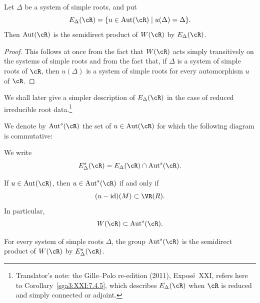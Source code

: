\begin{proposition}\label{sga3:XXI:6.7.2}
Let \(\Delta\) be a system of simple roots, and put
\[
 E_\Delta(\cR)=
 \{u\in\operatorname{Aut}(\cR)\mid u(\Delta)=\Delta\}.
\]
Then \(\operatorname{Aut}(\cR)\) is the semidirect product of
\(W(\cR)\) by \(E_\Delta(\cR)\).
\end{proposition}

\begin{proof}
This follows at once from the fact that \(W(\cR)\) acts simply
transitively on the systems of simple roots and from the fact that,
if \(\Delta\) is a system of simple roots of \(\cR\), then
\(u(\Delta)\) is a system of simple roots for every automorphism
\(u\) of \(\cR\).
\end{proof}

We shall later give a simpler description of \(E_\Delta(\cR)\) in
the case of reduced irreducible root data.\footnote{Translator's note: the Gille--Polo re-edition (2011), Exposé~XXI, refers here to
Corollary~\ref{sga3:XXI:7.4.5}, which describes \(E_\Delta(\cR)\) when \(\cR\) is reduced
and simply connected or adjoint.}

\begin{definition}\label{sga3:XXI:6.7.3}
We denote by \(\operatorname{Aut}^{s}(\cR)\)
the set of \(u\in\operatorname{Aut}(\cR)\) for which the following
diagram is commutative:
\begin{center}
\end{center}
We write
\[
 E_\Delta^{s}(\cR)
 =E_\Delta(\cR)\cap\operatorname{Aut}^{s}(\cR).
\]
\end{definition}

\begin{remark}\label{sga3:XXI:6.7.4}
If \(u\in\operatorname{Aut}(\cR)\), then
\(u\in\operatorname{Aut}^{s}(\cR)\) if and only if
\[
 (u-\operatorname{id})(M)\subset\VR(R).
\]
In particular,
\[
 W(\cR)\subset\operatorname{Aut}^{s}(\cR).
\]
\end{remark}

\begin{proposition}\label{sga3:XXI:6.7.5}
For every system of simple roots \(\Delta\), the group
\(\operatorname{Aut}^{s}(\cR)\) is the semidirect product of
\(W(\cR)\) by \(E_\Delta^{s}(\cR)\).
\end{proposition}

